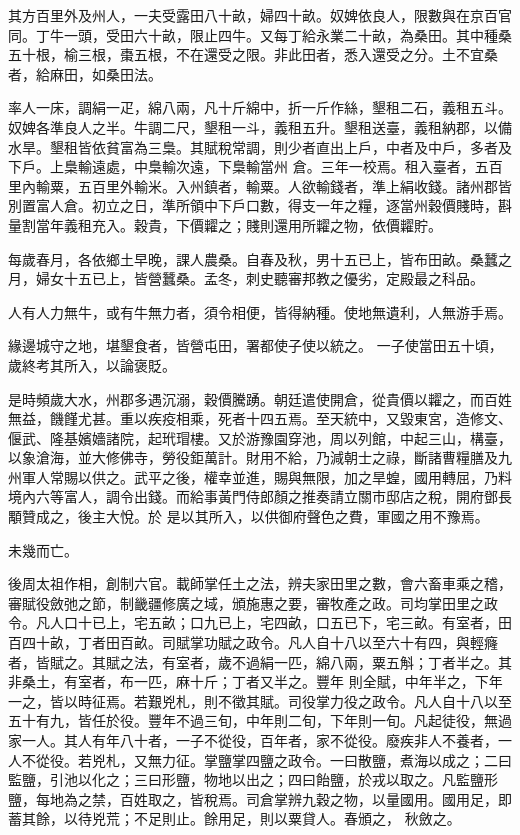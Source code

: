 \begin{pinyinscope}
 其方百里外及州人，一夫受露田八十畝，婦四十畝。奴婢依良人，限數與在京百官同。丁牛一頭，受田六十畝，限止四牛。又每丁給永業二十畝，為桑田。其中種桑五十根，榆三根，棗五根，不在還受之限。非此田者，悉入還受之分。土不宜桑者，給麻田，如桑田法。



 率人一床，調絹一疋，綿八兩，凡十斤綿中，折一斤作絲，墾租二石，義租五斗。奴婢各準良人之半。牛調二尺，墾租一斗，義租五升。墾租送臺，義租納郡，以備水旱。墾租皆依貧富為三梟。其賦稅常調，則少者直出上戶，中者及中戶，多者及下戶。上梟輸遠處，中梟輸次遠，下梟輸當州
 倉。三年一校焉。租入臺者，五百里內輸粟，五百里外輸米。入州鎮者，輸粟。人欲輸錢者，準上絹收錢。諸州郡皆別置富人倉。初立之日，準所領中下戶口數，得支一年之糧，逐當州穀價賤時，斟量割當年義租充入。穀貴，下價糶之；賤則還用所糶之物，依價糶貯。



 每歲春月，各依鄉土早晚，課人農桑。自春及秋，男十五已上，皆布田畝。桑蠶之月，婦女十五已上，皆營蠶桑。孟冬，刺史聽審邦教之優劣，定殿最之科品。



 人有人力無牛，或有牛無力者，須令相便，皆得納種。使地無遺利，人無游手焉。



 緣邊城守之地，堪墾食者，皆營屯田，署都使子使以統之。
 一子使當田五十頃，歲終考其所入，以論褒貶。



 是時頻歲大水，州郡多遇沉溺，穀價騰踴。朝廷遣使開倉，從貴價以糶之，而百姓無益，饑饉尤甚。重以疾疫相乘，死者十四五焉。至天統中，又毀東宮，造修文、偃武、隆基嬪嬙諸院，起玳瑁樓。又於游豫園穿池，周以列館，中起三山，構臺，以象滄海，並大修佛寺，勞役鉅萬計。財用不給，乃減朝士之祿，斷諸曹糧膳及九州軍人常賜以供之。武平之後，權幸並進，賜與無限，加之旱蝗，國用轉屈，乃料境內六等富人，調令出錢。而給事黃門侍郎顏之推奏請立關市邸店之稅，開府鄧長顒贊成之，後主大悅。於
 是以其所入，以供御府聲色之費，軍國之用不豫焉。



 未幾而亡。



 後周太祖作相，創制六官。載師掌任土之法，辨夫家田里之數，會六畜車乘之稽，審賦役斂弛之節，制畿疆修廣之域，頒施惠之要，審牧產之政。司均掌田里之政令。凡人口十已上，宅五畝；口九已上，宅四畝，口五已下，宅三畝。有室者，田百四十畝，丁者田百畝。司賦掌功賦之政令。凡人自十八以至六十有四，與輕癃者，皆賦之。其賦之法，有室者，歲不過絹一匹，綿八兩，粟五斛；丁者半之。其非桑土，有室者，布一匹，麻十斤；丁者又半之。豐年
 則全賦，中年半之，下年一之，皆以時征焉。若艱兇札，則不徵其賦。司役掌力役之政令。凡人自十八以至五十有九，皆任於役。豐年不過三旬，中年則二旬，下年則一旬。凡起徒役，無過家一人。其人有年八十者，一子不從役，百年者，家不從役。廢疾非人不養者，一人不從役。若兇札，又無力征。掌鹽掌四鹽之政令。一曰散鹽，煮海以成之；二曰監鹽，引池以化之；三曰形鹽，物地以出之；四曰飴鹽，於戎以取之。凡監鹽形鹽，每地為之禁，百姓取之，皆稅焉。司倉掌辨九穀之物，以量國用。國用足，即蓄其餘，以待兇荒；不足則止。餘用足，則以粟貸人。春頒之，
 秋斂之。




\end{pinyinscope}
